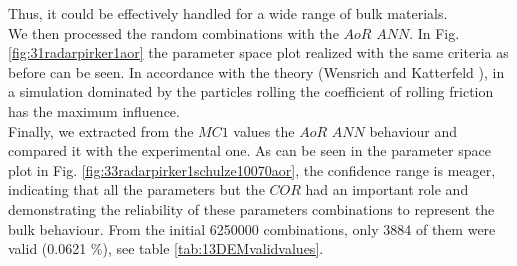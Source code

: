 Thus, it could be effectively handled for a wide range of bulk materials.\\
We then processed the random combinations with the $AoR$ $ANN$. In Fig.
\ref{fig:31radarpirker1aor} the parameter space plot realized with the same criteria as
before can be seen.
In accordance with the theory (Wensrich and Katterfeld \cite{RefWorks:87}), in a simulation dominated
by the particles rolling the coefficient of rolling friction has the maximum
influence. \\
Finally, we extracted from the $MC1$ values the $AoR$ $ANN$ behaviour
and compared it with the experimental one.
As can be seen in the parameter space plot in Fig.
\ref{fig:33radarpirker1schulze10070aor}, the confidence range is meager, indicating that all the parameters but the $COR$ 
had an important role and demonstrating the reliability of these parameters
combinations to represent the bulk behaviour.
From the initial 6250000 combinations, only 3884 of them were valid (0.0621 \%),
see table \ref{tab:13DEMvalidvalues}.









